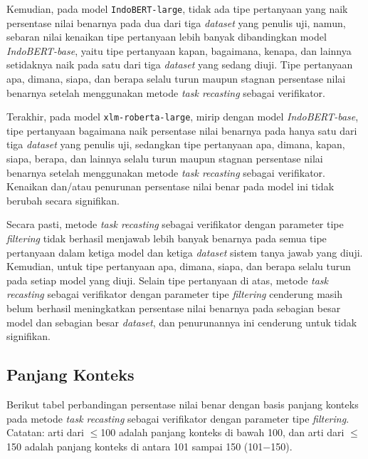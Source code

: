 Kemudian, pada model \texttt{IndoBERT-large}, tidak ada tipe pertanyaan yang naik persentase nilai benarnya pada dua dari tiga \emph{dataset} yang penulis uji, namun, sebaran nilai kenaikan tipe pertanyaan lebih banyak dibandingkan model \emph{IndoBERT-base}, yaitu tipe pertanyaan kapan, bagaimana, kenapa, dan lainnya setidaknya naik pada satu dari tiga \emph{dataset} yang sedang diuji. Tipe pertanyaan apa, dimana, siapa, dan berapa selalu turun maupun stagnan persentase nilai benarnya setelah menggunakan metode \emph{task recasting} sebagai verifikator.

Terakhir, pada model \texttt{xlm-roberta-large}, mirip dengan model \emph{IndoBERT-base}, tipe pertanyaan bagaimana naik persentase nilai benarnya pada hanya satu dari tiga \emph{dataset} yang penulis uji, sedangkan tipe pertanyaan apa, dimana, kapan, siapa, berapa, dan lainnya selalu turun maupun stagnan persentase nilai benarnya setelah menggunakan metode \emph{task recasting} sebagai verifikator. Kenaikan dan/atau penurunan persentase nilai benar pada model ini tidak berubah secara signifikan.

Secara pasti, metode \emph{task recasting} sebagai verifikator dengan parameter tipe \emph{filtering} tidak berhasil menjawab lebih banyak benarnya pada semua tipe pertanyaan dalam ketiga model dan ketiga \emph{dataset} sistem tanya jawab yang diuji. Kemudian, untuk tipe pertanyaan apa, dimana, siapa, dan berapa selalu turun pada setiap model yang diuji. Selain tipe pertanyaan di atas, metode \emph{task recasting} sebagai verifikator dengan parameter tipe \emph{filtering} cenderung masih belum berhasil meningkatkan persentase nilai benarnya pada sebagian besar model dan sebagian besar \emph{dataset}, dan penurunannya ini cenderung untuk tidak signifikan.

\subsection{Panjang Konteks}
Berikut tabel perbandingan persentase nilai benar dengan basis panjang konteks pada metode \emph{task recasting} sebagai verifikator dengan parameter tipe \emph{filtering}. Catatan: arti dari $\leq$100 adalah panjang konteks di bawah 100, dan arti dari $\leq$150 adalah panjang konteks di antara 101 sampai 150 (101$-$150).

